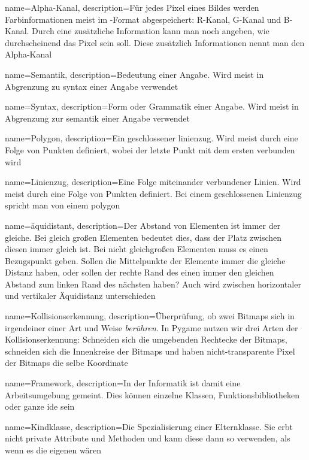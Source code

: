 {
  name={Alpha-Kanal},
  description={Für jedes Pixel eines Bildes werden Farbinformationen meist im -Format abgespeichert: R-Kanal, G-Kanal und B-Kanal. Durch eine zusätzliche Information kann man noch angeben, wie durchscheinend das Pixel sein soll. Diese zusätzlich Informationen nennt man den Alpha-Kanal} 
}

{
  name={Semantik},
  description={Bedeutung einer Angabe. Wird meist in Abgrenzung zu \Gls{syntax} einer Angabe verwendet} 
}

{
  name={Syntax},
  description={Form oder Grammatik einer Angabe. Wird meist in Abgrenzung zur \Gls{semantik} einer Angabe verwendet} 
}

{
  name={Polygon},
  description={Ein geschlossener \gls{linienzug}. Wird meist durch eine Folge von Punkten definiert, wobei der letzte Punkt mit dem ersten verbunden wird} 
}

{
  name={Linienzug},
  description={Eine Folge miteinander verbundener Linien. Wird meist durch eine Folge von Punkten definiert. Bei einem geschlossenen Linienzug spricht man von einem \gls{polygon}} 
}

{
	name={\"aquidistant},
	description={Der Abstand von Elementen ist immer der gleiche. Bei gleich großen Elementen bedeutet dies, dass der Platz zwischen diesen immer gleich ist. Bei nicht gleichgroßen Elementen muss es einen Bezugspunkt geben. Sollen die Mittelpunkte der Elemente immer die gleiche Distanz haben, oder sollen der rechte Rand des einen immer den gleichen Abstand zum linken Rand des nächsten haben? Auch wird zwischen horizontaler und vertikaler Äquidistanz unterschieden} 
}

 {
 	name={Kollisionserkennung},
 	description={Überprüfung, ob zwei Bitmaps sich in irgendeiner einer Art und Weise \emph{berühren}. In Pygame nutzen wir drei Arten der Kollisionserkennung: Schneiden sich die umgebenden Rechtecke der Bitmaps, schneiden sich die Innenkreise der Bitmaps und haben nicht-transparente Pixel der Bitmaps die selbe Koordinate} 
 }
 
 {
 	name={Framework},
 	description={In der Informatik ist damit eine Arbeitsumgebung gemeint. Dies können einzelne Klassen, Funktionsbibliotheken oder ganze \Gls{ide} sein} 
 }
 
 {
 	name={Kindklasse},
 	description={Die Spezialisierung einer Elternklasse. Sie erbt nicht private Attribute und Methoden und kann diese dann so verwenden, als wenn es die eigenen wären} 
 }

